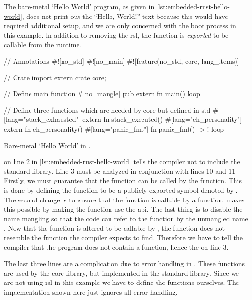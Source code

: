 The bare-metal `Hello World' program, as given in \autoref{lst:embedded-rust-hello-world}, does not print out the ``Hello, World!'' text because this would have required additional setup, and we are only concerned with the boot process in this example.
In addition to removing the \gls{rsl}, the {\main} function is \emph{exported} to be callable from the {\C} runtime.

\begin{listing}[H]
  \begin{rustcode}
// Annotations
#![no_std]
#![no_main]
#![feature(no_std, core, lang_items)]

// Crate import
extern crate core;

// Define main function
#[no_mangle]
pub extern fn main() {
  loop {}
}

// Define three functions which are needed by core but defined in std
#[lang="stack_exhausted"] extern fn stack_executed() {}
#[lang="eh_personality"] extern fn eh_personality() {}
#[lang="panic_fmt"] fn panic_fmt() -> ! { loop {} }
\end{rustcode}
\caption{Bare-metal `Hello World' in {\rust}.}
\label{lst:embedded-rust-hello-world}
\end{listing}

\attrib{\#\![no\_std]} on line 2 in \autoref{lst:embedded-rust-hello-world} tells the {\rust} compiler not to include the standard library.
Line 3 must be analyzed in conjunction with lines 10 and 11.
Firstly, we must guarantee that the function can be called by the  function.
This is done by defining the {\main} function to be a publicly exported symbol denoted by .
The second change is to ensure that the function is callable by a {\C} function.
 makes this possible by making the function use the {\C} \gls{abi}.
The last thing is to disable the {\rust} name mangling so that the {\C} code can refer to the function by the unmangled name {\main}.
Now that the {\main} function is altered to be callable by {\C}, the function does not resemble the function the {\rust} compiler expects to find.
Therefore we have to tell the compiler that the program does not contain a {\main} function, hence the \attrib{\#\![no\_main]} on line 3.

The last three lines are a complication due to error handling in {\rust}.
These functions are used by the core library, but implemented in the standard library.
Since we are not using \gls{rsl} in this example we have to define the functions ourselves.
The implementation shown here just ignores all error handling.

